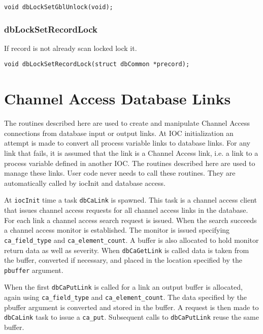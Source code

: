\begin{verbatim}
void dbLockSetGblUnlock(void);
\end{verbatim}

\subsubsection{dbLockSetRecordLock}

If record is not already scan locked lock it.

\begin{verbatim}
void dbLockSetRecordLock(struct dbCommon *precord);
\end{verbatim}

\section{Channel Access Database Links}

The routines described here are used to create and manipulate Channel Access connections from database input or output 
links. At IOC initialization an attempt is made to convert all process variable links to database links. For any link that 
fails, it is assumed that the link is a Channel Access link, i.e. a link to a process variable defined in another IOC. The 
routines described here are used to manage these links. User code never needs to call these routines. They are 
automatically called by iocInit and database access.

At \verb|iocInit| time a task \verb|dbCaLink| is spawned. This task is a channel access client that issues channel access requests 
for all channel access links in the database. For each link a channel access search request is issued. When the search 
succeeds a channel access monitor is established. The monitor is issued specifying \verb|ca_field_type| and 
\verb|ca_element_count|. A buffer is also allocated to hold monitor return data as well as severity. When \verb|dbCaGetLink| is 
called data is taken from the buffer, converted if necessary, and placed in the location specified by the \verb|pbuffer| 
argument.

When the first \verb|dbCaPutLink| is called for a link an output buffer is allocated, again using \verb|ca_field_type| and 
\verb|ca_element_count|. The data specified by the pbuffer argument is converted and stored in the buffer. A request is then 
made to \verb|dbCaLink| task to issue a \verb|ca_put|. Subsequent calls to \verb|dbCaPutLink| reuse the same buffer.

